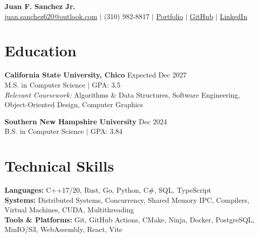 \documentclass[10pt,letterpaper]{article}
\begin{document}
\pagestyle{empty}

\begin{center}
    \textbf{\Huge Juan F. Sanchez Jr.} \\ \vspace{3pt}
    \href{mailto:juan.sanchez620@outlook.com}{juan.sanchez620@outlook.com}
    \hspace{0.4em}$|$\hspace{0.4em}
    (310) 982-8817
    \hspace{0.4em}$|$\hspace{0.4em}
    \href{https://rowrow620.github.io/MyPortfolio/}{Portfolio}
    \hspace{0.4em}$|$\hspace{0.4em}
    \href{https://github.com/Rowrow620}{GitHub}
    \hspace{0.4em}$|$\hspace{0.4em}
    \href{https://www.linkedin.com/in/juan-sanchez-b7b276348/}{LinkedIn}
\end{center}

\section*{Education}

\textbf{California State University, Chico}
\hfill Expected Dec 2027 \\
M.S. in Computer Science
\hspace{0.5em}$|$\hspace{0.5em}
GPA: 3.5 \\
\textit{Relevant Coursework:} Algorithms \& Data Structures, Software Engineering,
Object-Oriented Design, Computer Graphics

\vspace{3pt}
\textbf{Southern New Hampshire University}
\hfill Dec 2024 \\
B.S. in Computer Science
\hspace{0.5em}$|$\hspace{0.5em}
GPA: 3.84

\section*{Technical Skills}

\textbf{Languages:} C++17/20, Rust, Go, Python, C\#, SQL, TypeScript \\
\textbf{Systems:} Distributed Systems, Concurrency, Shared Memory IPC, Compilers, Virtual Machines, CUDA, Multithreading \\
\textbf{Tools \& Platforms:} Git, GitHub Actions, CMake, Ninja, Docker, PostgreSQL, MinIO/S3, WebAssembly, React, Vite
\end{document}
